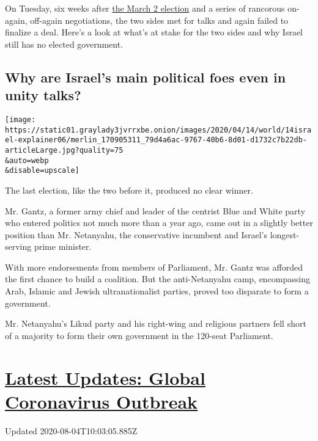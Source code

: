 On Tuesday, six weeks after
\href{https://www.nytimes3xbfgragh.onion/2020/03/03/world/middleeast/israel-election-takeaways.html}{the
March 2 election} and a series of rancorous on-again, off-again
negotiations, the two sides met for talks and again failed to finalize a
deal. Here's a look at what's at stake for the two sides and why Israel
still has no elected government.

\hypertarget{why-are-israels-main-political-foes-even-in-unity-talks}{%
\subsection{Why are Israel's main political foes even in unity
talks?}\label{why-are-israels-main-political-foes-even-in-unity-talks}}

\texttt{[image: https://static01.graylady3jvrrxbe.onion/images/2020/04/14/world/14israel-explainer06/merlin\_170905311\_79d4a6ac-9767-40b6-8d01-d1732c7b22db-articleLarge.jpg?quality=75\\\&auto=webp\\\&disable=upscale]}

The last election, like the two before it, produced no clear winner.

Mr. Gantz, a former army chief and leader of the centrist Blue and White
party who entered politics not much more than a year ago, came out in a
slightly better position than Mr. Netanyahu, the conservative incumbent
and Israel's longest-serving prime minister.

With more endorsements from members of Parliament, Mr. Gantz was
afforded the first chance to build a coalition. But the anti-Netanyahu
camp, encompassing Arab, Islamic and Jewish ultranationalist parties,
proved too disparate to form a government.

Mr. Netanyahu's Likud party and his right-wing and religious partners
fell short of a majority to form their own government in the 120-seat
Parliament.

\hypertarget{latest-updates-global-coronavirus-outbreak}{%
\section{\texorpdfstring{\href{https://www.nytimes3xbfgragh.onion/2020/08/04/world/coronavirus-covid-19.html?action=click\&pgtype=Article\&state=default\&region=MAIN_CONTENT_1\&context=storylines_live_updates}{Latest
Updates: Global Coronavirus
Outbreak}}{Latest Updates: Global Coronavirus Outbreak}}\label{latest-updates-global-coronavirus-outbreak}}

Updated 2020-08-04T10:03:05.885Z

